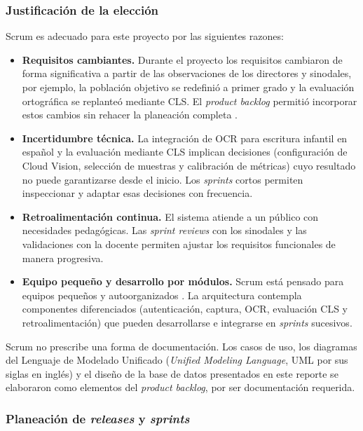 \subsubsection{Justificación de la elección}

Scrum es adecuado para este proyecto por las siguientes razones:

\begin{itemize}
    \item \textbf{Requisitos cambiantes.} Durante el proyecto los requisitos cambiaron de
    forma significativa a partir de las observaciones de los directores y sinodales, por
    ejemplo, la población objetivo se redefinió a primer grado y la evaluación ortográfica
    se replanteó mediante CLS. El \textit{product backlog} permitió incorporar estos
    cambios sin rehacer la planeación completa \cite{rubin2012essential}.

    \item \textbf{Incertidumbre técnica.} La integración de OCR para escritura infantil en
    español y la evaluación mediante CLS implican decisiones (configuración de Cloud
    Vision, selección de muestras y calibración de métricas) cuyo resultado no puede
    garantizarse desde el inicio. Los \textit{sprints} cortos permiten inspeccionar y
    adaptar esas decisiones con frecuencia.

    \item \textbf{Retroalimentación continua.} El sistema atiende a un público con
    necesidades pedagógicas. Las \textit{sprint reviews} con los sinodales y
    las validaciones con la docente permiten ajustar los requisitos funcionales de manera progresiva.

    \item \textbf{Equipo pequeño y desarrollo por módulos.} Scrum está pensado para equipos
    pequeños y autoorganizados \cite{schwaber2020scrum}. La arquitectura contempla
    componentes diferenciados (autenticación, captura, OCR, evaluación CLS y
    retroalimentación) que pueden desarrollarse e integrarse en \textit{sprints} sucesivos.
\end{itemize}

Scrum no prescribe una forma de documentación. Los casos de uso, los diagramas del Lenguaje de Modelado Unificado (\textit{Unified Modeling Language}, UML por sus siglas en inglés) y el
diseño de la base de datos presentados en este reporte se elaboraron como elementos del
\textit{product backlog}, por ser documentación requerida.

\subsubsection{Planeación de \textit{releases} y \textit{sprints}}

